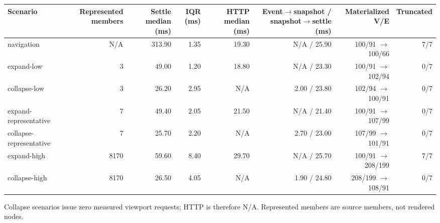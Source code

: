 \begin{tabular}{lrrrrrrr}
\hline
Scenario & Represented members & Settle median (ms) & IQR (ms) & HTTP median (ms) & Event\ensuremath{\to}snapshot / snapshot\ensuremath{\to}settle (ms) & Materialized V/E & Truncated \\
\hline
navigation & N/A & 313.90 & 1.35 & 19.30 & N/A / 25.90 & 100/91 \ensuremath{\to} 100/66 & 7/7 \\
expand-low & 3 & 49.00 & 1.20 & 18.80 & N/A / 23.30 & 100/91 \ensuremath{\to} 102/94 & 0/7 \\
collapse-low & 3 & 26.20 & 2.95 & N/A & 2.00 / 23.80 & 102/94 \ensuremath{\to} 100/91 & 0/7 \\
expand-representative & 7 & 49.40 & 2.05 & 21.50 & N/A / 21.40 & 100/91 \ensuremath{\to} 107/99 & 0/7 \\
collapse-representative & 7 & 25.70 & 2.20 & N/A & 2.70 / 23.00 & 107/99 \ensuremath{\to} 101/91 & 0/7 \\
expand-high & 8170 & 59.60 & 8.40 & 29.70 & N/A / 25.70 & 100/91 \ensuremath{\to} 208/199 & 7/7 \\
collapse-high & 8170 & 26.50 & 4.05 & N/A & 1.90 / 24.80 & 208/199 \ensuremath{\to} 108/91 & 0/7 \\
\hline
\end{tabular}

\par\smallskip
\footnotesize Collapse scenarios issue zero measured viewport requests; HTTP is therefore N/A. Represented members are source members, not rendered nodes.
